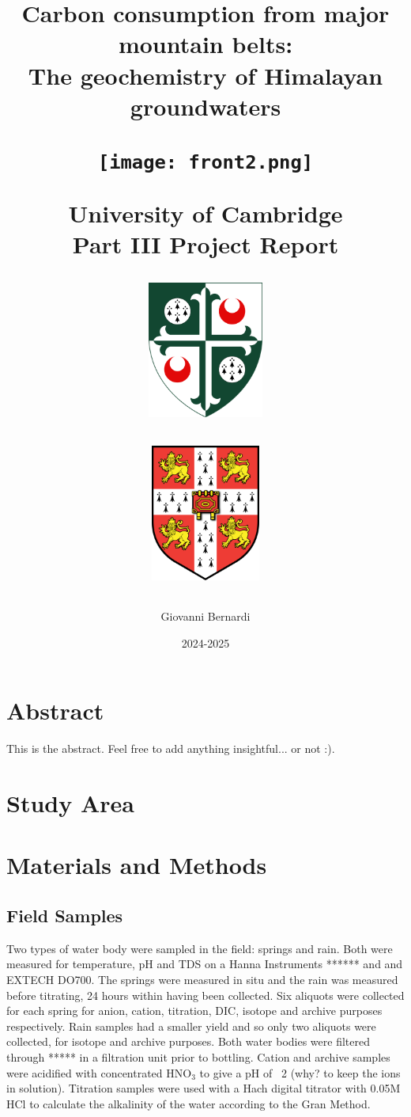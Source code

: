\documentclass[hidelinks, 12pt]{article} %
\title{
\vspace{-1cm}
\textbf{Carbon consumption from major mountain belts: \\ The geochemistry of Himalayan groundwaters}

\vspace{0.5cm}



\begin{figure}[h]
\texttt{[image: front2.png]}
\centering

\end{figure}


University of Cambridge \\
Part III Project Report \\

\begin{figure}
    \centering
    \begin{subfigure}{.45\textwidth} %
        \centering
        \includegraphics[height=4.5cm]{girton.png} %
        \label{fig:sub1}
    \end{subfigure}%
    \hspace{1.5cm} %
    \begin{subfigure}{.45\textwidth} %
        \centering
        \includegraphics[height=4.5cm]{cambridge.png} %
        \label{fig:sub2}
    \end{subfigure}
    \label{fig:test}
\end{figure}


}
\author{Giovanni Bernardi}
\date{2024-2025} %
\begin{document}
\maketitle




\thispagestyle{empty}

\newpage

\section*{Abstract}
\label{sec:abstract}

This is the abstract. Feel free to add anything insightful... or not :).



\newpage


\thispagestyle{empty}

\tableofcontents

\newpage




\FloatBarrier
{}



\section{Study Area}





\section{Materials and Methods}



\subsection{Field Samples}
Two types of water body were sampled in the field: springs and rain. 
Both were measured for temperature, pH and TDS on a Hanna Instruments ****** and  and EXTECH DO700. 
The springs were measured in situ and the rain was measured before titrating, 24 hours within having been collected. 
Six aliquots were collected for each spring for anion, cation, titration, DIC, isotope and archive purposes respectively. 
Rain samples had a smaller yield and so only two aliquots were collected, for isotope and archive purposes. 
Both water bodies were filtered through ***** in a filtration unit prior to bottling. 
Cation and archive samples were acidified with concentrated HNO$_3$ to give a pH of ~2 (why? to keep the ions in solution). 
Titration samples were used with a Hach digital titrator with 0.05M HCl to calculate the alkalinity of the water according to the Gran Method.
\end{document}
